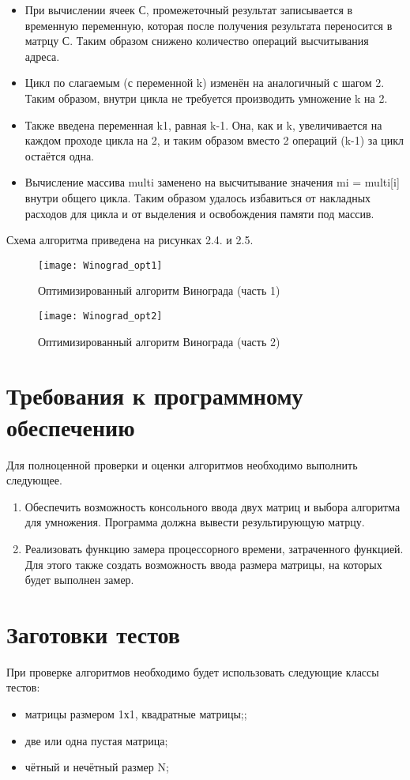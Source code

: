 \begin{itemize}
	\item При вычислении ячеек С, промежеточный результат записывается в временную переменную, которая после получения результата переносится в матрцу С. Таким образом снижено количество операций высчитывания адреса.
	\item Цикл по слагаемым (с переменной k) изменён на аналогичный с шагом 2. Таким образом, внутри цикла не требуется производить умножение k на 2.
	\item Также введена переменная k1, равная k-1. Она, как и k, увеличивается на каждом проходе цикла на 2, и таким образом вместо 2 операций (k-1) за цикл остаётся одна.
	\item Вычисление массива multi заменено на высчитывание значения mi = multi[i] внутри общего цикла. Таким образом удалось избавиться от накладных расходов для цикла и от выделения и освобождения памяти под массив.
\end{itemize}

Схема алгоритма приведена на рисунках 2.4. и 2.5.
\begin{figure}[h]
	\begin{center}
		{\texttt{[image: Winograd\_opt1]}}
		\caption{Оптимизированный алгоритм Винограда (часть 1)}
	\end{center}
\end{figure}
\begin{figure}[h]
	\begin{center}
		{\texttt{[image: Winograd\_opt2]}}
		\caption{Оптимизированный алгоритм Винограда (часть 2)}
	\end{center}
\end{figure}


\section{Требования к программному обеспечению}
Для полноценной проверки и оценки алгоритмов необходимо выполнить следующее.
\begin{enumerate}
	\item Обеспечить возможность консольного ввода двух матриц и выбора алгоритма для умножения. Программа должна вывести результирующую матрцу.
	\item Реализовать функцию замера процессорного времени, затраченного функцией. Для этого также создать возможность ввода размера матрицы, на которых будет выполнен замер.
\end{enumerate}


\section{Заготовки тестов}
При проверке алгоритмов необходимо будет использовать следующие классы тестов:
\begin{itemize}
	\item матрицы размером 1х1, квадратные матрицы;;
	\item две или одна пустая матрица;
	\item чётный и нечётный размер N;
\end{itemize}



